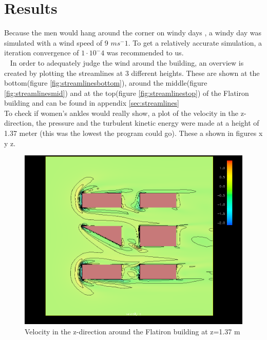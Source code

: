 \section{Results}
\label{sec:results}
Because the men would hang around the corner on windy days \cite{dresses}, a windy day was simulated with a wind speed of 9 $ms^-1$. To get a relatively accurate simulation, a iteration convergence of $1\cdot10^-4$ was recommended to us. \\\
\indent %
In order to adequately judge the wind around the building, an overview is created by plotting the streamlines at 3 different heights. These are shown at the bottom(figure \ref{fig:streamlinesbottom}), around the middle(figure \ref{fig:streamlinesmid}) and at the top(figure \ref{fig:streamlinestop}) of the Flatiron building and can be found in appendix \ref{sec:streamlines} \\
To check if women's ankles would really show, a plot of the velocity in the z-direction, the pressure and the turbulent kinetic energy were made at a height of 1.37 meter (this was the lowest the program could go). These a shown in figures x y z. \\
\begin{figure}[h!]
\centering
\includegraphics[width = \textwidth]{zvelocity.png}
\caption{Velocity in the z-direction around the Flatiron building at z=1.37 m}
\label{fig:zvelocity}
\end{figure}\\
